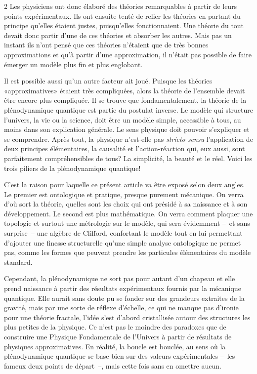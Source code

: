 \begin{multicols}{2}
Les physiciens ont donc élaboré des théories remarquables à partir de
leurs points expérimentaux. Ils ont ensuite tenté de relier les
théories en partant du principe qu'elles étaient justes, puisqu'elles
fonctionnaient. Une théorie du tout devait donc partir d'une de ces
théories et absorber les autres. Mais pas un instant ils n'ont pensé
que ces théories n'étaient que de très bonnes approximations et qu'à
partir d'une approximation, il n'était pas possible de faire émerger
un modèle plus fin et plus englobant.

Il est possible aussi qu'un autre facteur ait joué. Puisque les
théories «approximatives» étaient très compliquées, alors la théorie
de l'ensemble devait être encore plus compliquée. Il se trouve que
fondamentalement, la théorie de la plénodynamique quantique est partie
du postulat inverse. Le modèle qui structure l'univers, la vie ou la
science, doit être un modèle simple, accessible à tous, au moins dans
son explication générale. Le sens physique doit pouvoir s'expliquer et
se comprendre. Après tout, la physique n'est-elle pas \textit{stricto sensu}
l'application de deux principes élémentaires, la causalité et
l'action-réaction qui, eux aussi, sont parfaitement compréhensibles de
tous? La simplicité, la beauté et le réel. Voici les trois piliers de
la plénodynamique quantique!

C'est la raison pour laquelle ce présent article va être exposé selon
deux angles. Le premier est ontologique et pratique, presque purement
mécanique. On verra d'où sort la théorie, quelles sont les choix qui
ont présidé à sa naissance et à son développement. Le second est plus
mathématique. On verra comment plaquer une topologie et surtout une
métrologie sur le modèle, qui sera évidemment --~et sans surprise~-- une
algèbre de Clifford, confortant le modèle tout en lui permettant
d'ajouter une finesse structurelle qu'une simple analyse ontologique
ne permet pas, comme les formes que peuvent prendre les particules
élémentaires du modèle standard.

Cependant, la plénodynamique ne sort pas pour autant d'un chapeau et
elle prend naissance à partir des résultats expérimentaux fournis par
la mécanique quantique. Elle aurait sans doute pu se fonder sur des
grandeurs extraites de la gravité, mais par une sorte de réflexe
d'échelle, ce qui ne manque pas d'ironie pour une théorie fractale,
l'idée s'est d'abord cristallisée autour des structures les plus
petites de la physique. Ce n'est pas le moindre des paradoxes que de
construire une Physique Fondamentale de l'Univers à partir de
résultats de physiques approximatives. En réalité, la boucle est
bouclée, au sens où la plénodynamique quantique se base bien sur des
valeurs expérimentales --~les fameux deux points de départ~--, mais
cette fois sans en omettre aucun.


\end{multicols}
